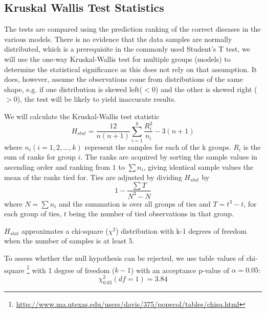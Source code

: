 \documentclass[10pt,letterpaper,final]{article}
\begin{document}
\subsection{Kruskal Wallis Test Statistics}
The tests are compared using the prediction ranking of the correct
diseases in the various models. There is no evidence that the data
samples are normally distributed, which is a prerequisite in the
commonly used Student's T test, we will use the one-way Kruskal-Wallis
\cite{kruskalwallis} test for multiple groups (models) to determine the
statistical significance as this does not rely on that assumption. It
does, however, assume the observations come from distributions of the
same shape, e.g. if one distribution is skewed left($<0$) and the other
is skewed right ($>0$), the test will be likely to yield inaccurate
results.

We will calculate the Kruskal-Wallis test statistic
\[
H_{stat} = \frac{12}{n(n+1)}\sum\limits_{i = 1}^{k} \frac{R^{2}_{i}}{n_{i}} - 3(n+1)
\]
where $n_{i} (i = 1, 2, ..., k)$ represent the samples for each of the k
groups. $R_{i}$ is the sum of ranks for group $i$. The ranks are
acquired by sorting the sample values in ascending order and ranking
from $1$ to $\sum n_{i}$, giving identical sample values the mean of the
ranks tied for. Ties are adjusted by dividing $H_{stat}$ by
\[
1 - \frac{\sum T}{N^3-N}
\]
where $N = \sum n_{i}$ and the summation is over all groups of ties and
$T = t^3-t$, for each group of ties, $t$ being the number of tied
observations in that group.

$H_{stat}$ approximates a chi-square ($\chi^2$) distribution with k-1
degrees of freedom when the number of samples is at least 5.

To assess whether the null hypothesis can be rejected, we use table
values of chi-square
\footnote{\url{http://www.ma.utexas.edu/users/davis/375/popecol/tables/chisq.html}}
with 1 degree of freedom ($k-1$) with an acceptance p-value of $\alpha
= 0.05$:
\[
\chi^2_{0.05}(df=1) = 3.84
\]



\end{document}
